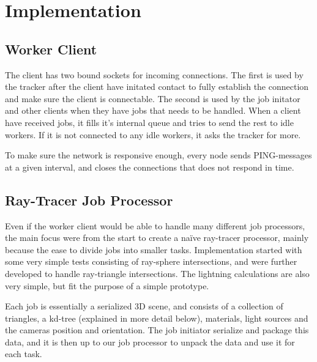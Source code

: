\chapter{Implementation}


\section{Worker Client}
The client has two bound sockets for incoming connections. The first is used by the tracker after the client have initated contact to fully establish the connection and make sure the client is connectable.
The second is used by the job initator and other clients when they have jobs that needs to be handled.
When a client have received jobs, it fills it's internal queue and tries to send the rest to idle workers. 
If it is not connected to any idle workers, it asks the tracker for more.

To make sure the network is responsive enough, every node sends PING-messages at a given interval, and closes the connections that does not respond in time.


\section{Ray-Tracer Job Processor}
Even if the worker client would be able to handle many different job processors, the main focus were from the start to create a naïve ray-tracer processor, mainly because the ease to divide jobs into smaller tasks. Implementation started with some very simple tests consisting of ray-sphere intersections, and were further developed to handle ray-triangle intersections. The lightning calculations are also very simple, but fit the purpose of a simple prototype.

Each job is essentially a serialized 3D scene, and consists of a collection of triangles, a kd-tree (explained in more detail below), materials, light sources and the cameras position and orientation. The job initiator serialize and package this data, and it is then up to our job processor to unpack the data and use it for each task.

